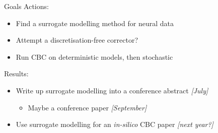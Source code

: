 \documentclass[presentation]{beamer}
\begin{document}
\begin{frame}[label={sec:org3fe9893}]{Goals}
Actions:
\begin{itemize}
\item Find a surrogate modelling method for neural data
\item Attempt a discretisation-free corrector?
\item Run CBC on deterministic models, then stochastic
\end{itemize}

\vfill

Results:
\begin{itemize}
\item Write up surrogate modelling into a conference abstract \emph{[July]}
\begin{itemize}
\item Maybe a conference paper \emph{[September]}
\end{itemize}
\item Use surrogate modelling for an \emph{in-silico} CBC paper \emph{[next year?]}
\end{itemize}
\end{frame}
\end{document}

